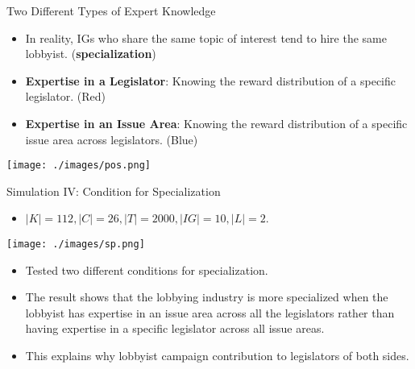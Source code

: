 \documentclass{beamer}
\begin{document}
	\begin{frame}{Two Different Types of Expert Knowledge}
		
			\begin{itemize}
				\item In reality, IGs who share the same topic of interest tend to hire the same lobbyist. (\textbf{specialization})

				\item \textbf{Expertise in a Legislator}: Knowing the reward distribution of a specific legislator. (Red)
				\item \textbf{Expertise in an Issue Area}: Knowing the reward distribution of a specific issue area across legislators. (Blue)
			\end{itemize}
			\centering	\texttt{[image: ./images/pos.png]}
	\end{frame}

	\begin{frame}{Simulation IV: Condition for Specialization}	
		\begin{itemize}
			\item  $|K|=112, |C|=26, |T|=2000,  |IG|=10, |L|=2$.
		\end{itemize}

		\centering	\texttt{[image: ./images/sp.png]}

		\begin{itemize}
			\item Tested two different conditions for specialization.
			\item The result shows that the lobbying industry is more specialized 
			when the lobbyist has expertise in an issue area across all the legislators
			rather than having expertise in a specific legislator across all issue areas.
			\item This explains why lobbyist campaign contribution to legislators of both sides.
		\end{itemize}	
	\end{frame}
\end{document}
